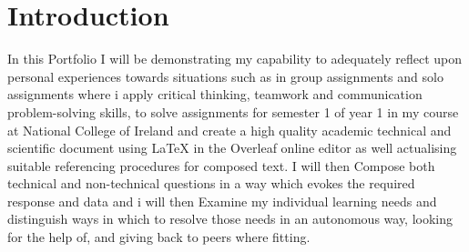 \documentclass[12pt]{article}
\begin{document}
\section*{Introduction}
\label{sec:intro}
In this Portfolio I will be demonstrating my capability to adequately reflect upon personal experiences towards situations such as in group assignments and solo assignments where i apply critical thinking, teamwork and communication problem-solving skills, to solve  assignments for semester 1 of year 1 in my course at National College of Ireland and create a high quality academic technical and scientific document using LaTeX in the Overleaf online editor as well actualising suitable referencing procedures for composed text.
I will then Compose both technical and non-technical questions in a way which evokes the required response and data and i will then Examine my individual learning needs and distinguish ways in which to resolve those needs in an autonomous way, looking for the help of, and giving back to peers where fitting.
\end{document}
